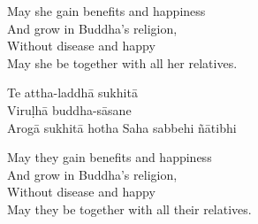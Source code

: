 \begin{english-verses}
  May she gain benefits and happiness\\
  And grow in Buddha's religion,\\
  Without disease and happy\\
  May she be together with all her relatives.
\end{english-verses}

\begin{pali-hang-continued}
  Te attha-laddhā sukhitā\\
  Viruḷhā buddha-sāsane\\
  Arogā sukhitā hotha
  Saha sabbehi ñātibhi
\end{pali-hang-continued}

\begin{english-verses}
  May they gain benefits and happiness\\
  And grow in Buddha's religion,\\
  Without disease and happy\\
  May they be together with all their relatives.
\end{english-verses}

\suttaRef{[AN 3.155]}

